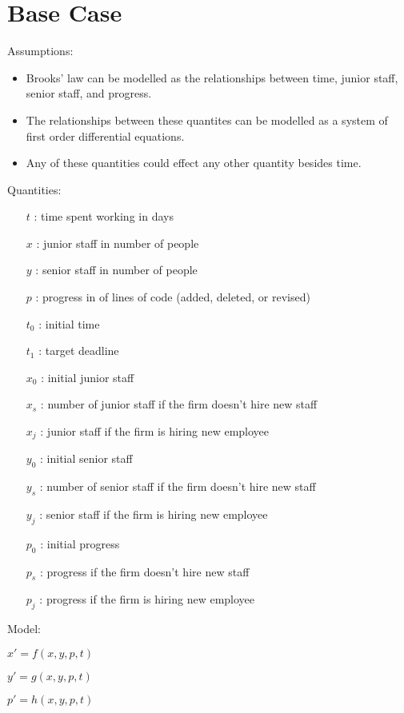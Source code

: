 \documentclass{article}
\newenvironment{atomize}
    {\begin{list} {} {
            \setlength\itemindent{0pt}
            \setlength\leftmargin{10pt}
            \setlength\labelwidth{0pt}
    }}
    {\end{list}}
\begin{document}
\section*{Base Case}
  \begin{atomize}
    \item Assumptions:
      \begin{itemize}
				\item Brooks' law can be modelled as the relationships between
				time, junior staff, senior staff, and progress.
				\item The relationships between these quantites can be modelled
				as a system of first order differential equations.
				\item Any of these quantities could effect any other quantity besides
				time.  
        \end{itemize}

    \item Quantities:
      \begin{itemize}
        \item [$t$]: time spent working in days
        \item [$x$]: junior staff in number of people
        \item [$y$]: senior staff in number of people
        \item [$p$]: progress in of lines of code (added, deleted, or revised)
        \item [$t_{0}$]: initial time
        \item [$t_{1}$]: target deadline
        \item [$x_{0}$]: initial junior staff
				\item [$x_{s}$]: number of junior staff if the firm doesn't hire new
				staff
        \item [$x_{j}$]: junior staff if the firm is hiring new employee
        \item [$y_{0}$]: initial senior staff
				\item [$y_{s}$]: number of senior staff if the firm doesn't hire new
				staff
        \item [$y_{j}$]: senior staff if the firm is hiring new employee
        \item [$p_{0}$]: initial progress
        \item [$p_{s}$]: progress if the firm doesn't hire new staff
        \item [$p_{j}$]: progress if the firm is hiring new employee
      \end{itemize}

    \item Model:
      \begin{atomize}
        \item $x\prime = f\left(x, y, p, t\right)$
        \item $y\prime = g\left(x, y, p, t\right)$
        \item $p\prime = h\left(x, y, p, t\right)$
      \end{atomize}
  \end{atomize}
\end{document}
